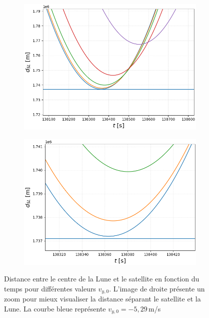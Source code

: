 \documentclass[a4paper,12pt,twoside]{article}
\begin{document}
\begin{figure}[H]
\begin{subfigure}{0.45\textwidth}  %
    \centering  %
    \includegraphics[scale=0.5]{Graphes/facultatif_1.png}
\end{subfigure}
\hspace{0.05\textwidth}
\begin{subfigure}{0.45\textwidth}  %
    \centering  %
    \includegraphics[scale=0.5]{Graphes/facultatif_2.png}
\end{subfigure}
\captionsetup{justification=centering}
\caption{Distance entre le centre de la Lune et le satellite en fonction du temps pour différentes valeurs $v_{y,0}$. L'image de droite présente un zoom pour mieux visualiser la distance séparant le satellite et la Lune. La courbe bleue représente $v_{y,0}=-5,29$\,m/s}
\label{fig10}
\end{figure}
\end{document}
